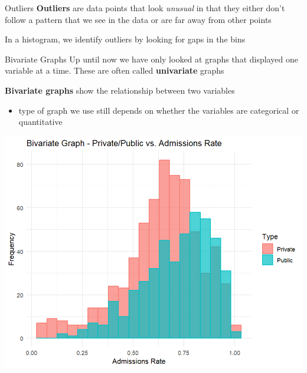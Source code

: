 \documentclass{beamer}
\begin{document}
\begin{frame}{Outliers}
\textbf{Outliers} are data points that look \textit{unusual} in that they either don't follow a pattern that we see in the data or are far away from other points \vspace{3mm}

In a histogram, we identify outliers by looking for gaps in the bins
\end{frame}

\begin{frame}{Bivariate Graphs}
Up until now we have only looked at graphs that displayed one variable at a time. These are often called \textbf{univariate} graphs \vspace{3mm}

\textbf{Bivariate graphs} show the relationship between two variables
\begin{itemize}
    \item type of graph we use still depends on whether the variables are categorical or quantitative 
\end{itemize}
\begin{center}
\includegraphics[scale=.4]{img/CollegeAdmissions.png}
\end{center}
\end{frame}
\end{document}
